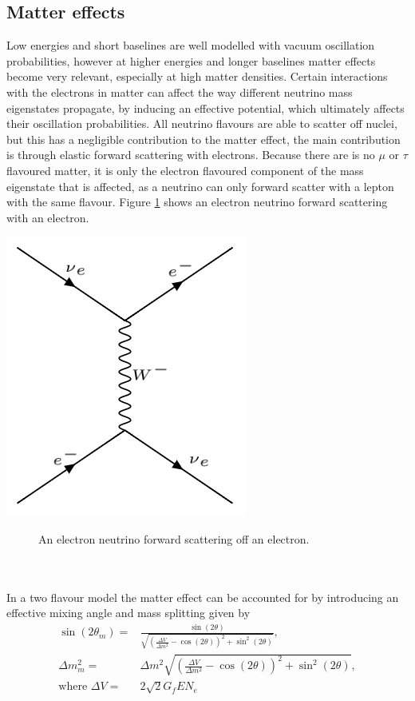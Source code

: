 \documentclass[12pt]{article}
\begin{document}
\subsection{Matter effects}
Low energies and short baselines are well modelled with vacuum oscillation probabilities, however at higher energies and longer baselines matter effects become very relevant, especially at high matter densities. Certain interactions with the electrons in matter can affect the way different neutrino mass eigenstates propagate, by inducing an effective potential, which ultimately affects their oscillation probabilities. All neutrino flavours are able to scatter off nuclei, but this has a negligible contribution to the matter effect, the main contribution is through elastic forward scattering with electrons\cite{MSW}. Because there are is no $\mu$ or $\tau$ flavoured matter, it is only the electron flavoured component of the mass eigenstate that is affected, as a neutrino can only forward scatter with a lepton with the same flavour. Figure \ref{fig:diagram} shows an electron neutrino forward scattering with an electron.
\begin{center}
\includegraphics[scale=0.4]{diagram.png}
\begin{figure}[h!]
\caption{An electron neutrino forward scattering off an electron.}
\label{fig:diagram}
\end{figure}
\end{center}\\\\
In a two flavour model the matter effect can be accounted for by introducing an effective mixing angle and mass splitting given by\cite{Zuber}
\begin{align}
\sin(2\theta_m)=&\frac{\sin(2\theta)}{\sqrt{(\frac{\Delta V}{\Delta m^2}-\cos(2\theta))^2+\sin^{2}(2\theta)}},\\
\Delta m_{m}^{2}=&\Delta m^{2}\sqrt{(\frac{\Delta V}{\Delta m^2}-\cos(2\theta))^2+\sin^{2}(2\theta)},\\
\text{where    }\Delta V=&2\sqrt{2}G_{f}EN_{e}
\end{align}
\end{document}

